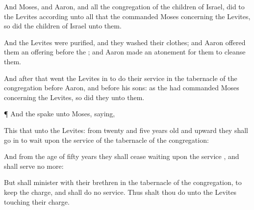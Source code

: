 {And
Moses, and
Aaron, and all the
congregation of the
children of
Israel,
did to the
Levites according unto all that the
{}
commanded
Moses concerning the
Levites, so
did the
children of
Israel unto them.

And the
Levites were
purified, and they
washed their
clothes; and
Aaron
offered them
{} an
offering
before the
{}; and
Aaron made an
atonement for them to
cleanse them.

And
after that
went the
Levites in to
do their
service in the
tabernacle of the
congregation
before
Aaron, and
before his
sons: as the
{} had
commanded
Moses concerning the
Levites, so
did they unto them.


\par }{\PP {}¶ And the
{}
spake unto
Moses,
saying,

This
{} that
{} unto the
Levites: from
twenty and
five
years
old and
upward they shall go
in to
wait upon the
service of the
tabernacle of the
congregation:

And from the
age of
fifty
years they shall
cease
waiting upon the
service
{}, and shall
serve no more:

But shall
minister with their
brethren in the
tabernacle of the
congregation, to
keep the
charge, and shall
do no
service. Thus shalt thou
do unto the
Levites touching their
charge.




\par }
